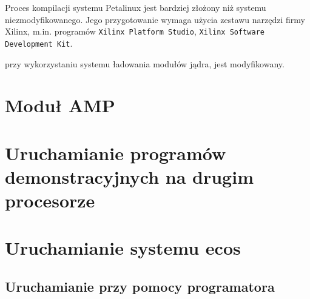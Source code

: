   Proces kompilacji systemu Petalinux jest bardziej złożony niż systemu niezmodyfikowanego. Jego przygotowanie wymaga użycia zestawu narzędzi firmy Xilinx, m.in. programów \texttt{Xilinx Platform Studio}, \texttt{Xilinx Software Development Kit}.
  
  
  przy wykorzystaniu systemu ładowania modułów jądra, jest modyfikowany. 
  
  
  
 \section{Moduł AMP} 
  \label{sec:modu_amp}
  
  
  
  
 \section{Uruchamianie programów demonstracyjnych na drugim procesorze} 
  \label{sec:uruchamianie_program_w_demonstracyjnych_na_drugim_procesorze}
  
  
  
  
  
 \section{Uruchamianie systemu ecos} 
  \label{sec:uruchamianie_systemu_ecos}
  
  
  \subsection{Uruchamianie przy pomocy programatora}
  	\label{ssub:uruchamianie_przy_pomocy_programatora}
  	
  	
